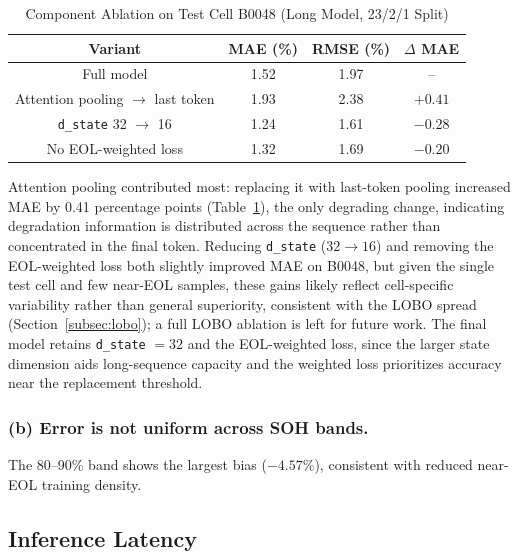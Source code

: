 \begin{table}[H]
  \caption{Component Ablation on Test Cell B0048 (Long Model, 23/2/1 Split)}
  \label{tab:ablation}
  \centering
  \small
  \tabairy
  \begin{tabular}{|c|c|c|c|}
    \hline
    \textbf{Variant} & \textbf{MAE (\%)} & \textbf{RMSE (\%)} &
    \textbf{$\Delta$ MAE} \\
    \hline
    Full model                                    & 1.52 & 1.97 & --      \\
    Attention pooling $\rightarrow$ last token    & 1.93 & 2.38 & $+0.41$ \\
    \texttt{d\_state} 32 $\rightarrow$ 16         & 1.24 & 1.61 & $-0.28$ \\
    No EOL-weighted loss                          & 1.32 & 1.69 & $-0.20$ \\
    \hline
  \end{tabular}
\end{table}

Attention pooling contributed most: replacing it with last-token pooling
increased MAE by 0.41 percentage points (Table~\ref{tab:ablation}), the only
degrading change, indicating degradation information is distributed across the
sequence rather than concentrated in the final token. Reducing
\texttt{d\_state} ($32 \rightarrow 16$) and removing the EOL-weighted loss both
slightly improved MAE on B0048, but given the single test cell and few near-EOL
samples, these gains likely reflect cell-specific variability rather than
general superiority, consistent with the LOBO spread
(Section~\ref{subsec:lobo}); a full LOBO ablation is left for future work. The
final model retains \texttt{d\_state} $= 32$ and the EOL-weighted loss, since
the larger state dimension aids long-sequence capacity and the weighted loss
prioritizes accuracy near the replacement threshold.

\subsubsection{(b) Error is not uniform across SOH bands.}
The 80--90\% band shows the largest bias ($-4.57\%$), consistent with reduced
near-EOL training density.

\subsection{Inference Latency}
\label{subsec:latency}

